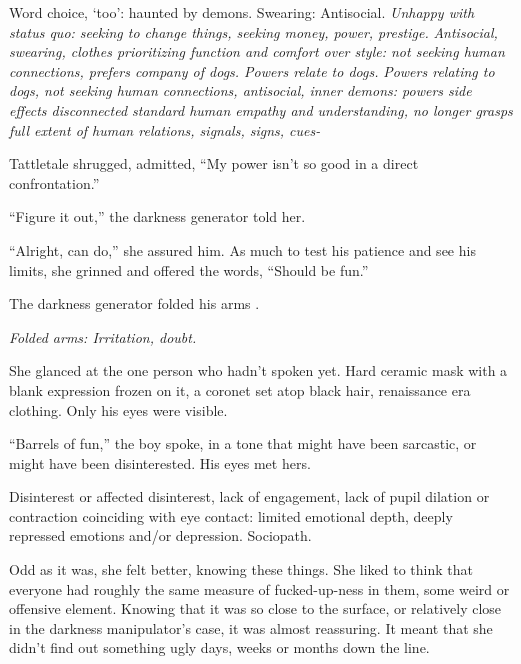 {Word choice, `too':  haunted by demons.
Swearing: Antisocial.\emph{ Unhappy with status quo:  seeking to change things, seeking money, power, prestige.}\emph{ Antisocial, swearing, clothes prioritizing function and comfort over style:  not seeking human connections, prefers company of dogs.  Powers relate to dogs.}\emph{ Powers relating to dogs, not seeking human connections, antisocial, inner demons: powers side effects disconnected standard human empathy and understanding, no longer grasps full extent of human relations, signals, signs, cues-}



Tattletale shrugged, admitted, ``My power isn't so good in a direct confrontation.''



``Figure it out,'' the darkness generator told her.



``Alright, can do,'' she assured him.  As much to test his patience and see his limits, she grinned and offered the words, ``Should be fun.''



The darkness generator folded his arms .



\emph{Folded arms: Irritation, doubt.}



She glanced at the one person who hadn't spoken yet.  Hard ceramic mask with a blank expression frozen on it, a coronet set atop black hair, renaissance era clothing.  Only his eyes were visible.



``Barrels of fun,'' the boy spoke, in a tone that might have been sarcastic, or might have been disinterested.  His eyes met hers.



Disinterest or affected disinterest, lack of engagement, lack of pupil dilation or contraction coinciding with eye contact:  limited emotional depth, deeply repressed emotions and/or depression.  Sociopath.



Odd as it was, she felt better, knowing these things.  She liked to think that everyone had roughly the same measure of fucked-up-ness in them, some weird or offensive element.  Knowing that it was so close to the surface, or relatively close in the darkness manipulator's case, it was almost reassuring.  It meant that she didn't find out something ugly days, weeks or months down the line.



}
